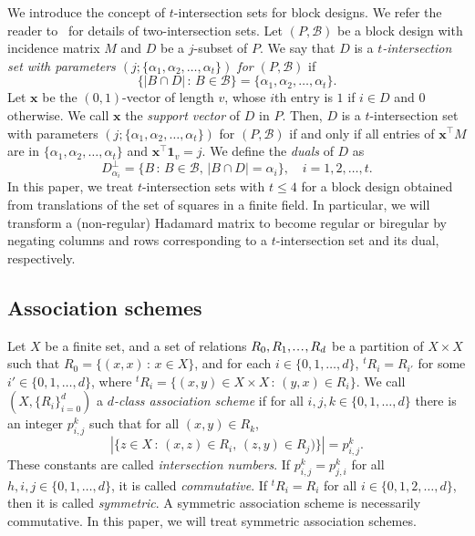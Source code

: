 \documentclass[ALCO,ThmDefs,Unicode]{cedram}
\newcommand*\tra{\top}
\newcommand*{\un}{\mathbf{1}}
\newcommand*{\bfx}{\mathbf{x}}
\newcommand*{\mk}{\mkern -1mu}
\newcommand*{\mK}{\mkern 1mu}
\newcommand{\sdots}{{\mk.\mK.\mK.\mK}}
\begin{document}
We introduce the concept of $t$-intersection sets for block designs. We refer the reader to~\cite{MS} for details of two-intersection sets. Let $(P,{\mathcal B})$ be a block design with incidence matrix $M$ and $D$ be a $j$-subset of $P$. We say that $D$ is a \emph{$t$-intersection set with parameters $(j;\{\alpha_1,\alpha_2,\ldots,\alpha_t\})$ for $(P,{\mathcal B})$} if
\[
\{|B\cap D|\,:\,B\in {\mathcal B}\}=\{\alpha_1,\alpha_2,\ldots,\alpha_t\}.
\]
Let $\bfx$ be the $(0,1)$-vector of length $v$, whose $i$th entry is $1$ if $i\in D$ and $0$ otherwise. We call $\bfx$ the \emph{support vector} of $D$ in $P$. Then, $D$ is a $t$-intersection set with parameters $(j;\{\alpha_1,\alpha_2,\ldots,\alpha_t\})$ for $(P,{\mathcal B})$ if and only if all entries of $\bfx^\tra M$ are in $\{\alpha_1,\alpha_2,\ldots,\alpha_t\}$ and $\bfx^\tra \un_{v}=j$. We define the \emph{duals} of $D$ as
\begin{equation}\label{eq:defdual}
D_{\alpha_i}^\perp=\{B\,:\,B\in {\mathcal B},\,|B\cap D|=\alpha_i\}, \quad i=1,2,\ldots,t.
\end{equation}
In this paper, we treat $t$-intersection sets with $t\le 4$ for a block design obtained from translations of the set of squares in a finite field. In particular, we will transform a (non-regular) Hadamard matrix to become regular or biregular by negating columns and rows corresponding to a $t$-intersection set and its dual, respectively.



\subsection{Association schemes}


Let $X$ be a finite set, and a set of relations $R_0, R_1,\sdots,R_d$ be a partition of $X\times X$ such that $R_0=\{(x,x)\,:\,x\in X\}$, and for each $i\in \{0,1,\ldots,d\}$, ${}^tR_i=R_{i'}$ for some $i'\in \{0,1,\ldots,d\}$, where ${}^t R_i=\{(x,y)\in X\times X\,:\,(y,x)\in R_i\}$. We call $(X,\{R_i\}_{i=0}^d)$ a \emph{$d$-class association scheme} if for all $i,j,k\in \{0,1,\ldots,d\}$ there is an integer $p_{i,j}^k$ such that for all $(x,y)\in R_k$,
\[
|\{z\in X\,:\,(x,z)\in R_i,\,(z,y)\in R_j)\}|=p_{i,j}^k.
\]
These constants are called \emph{intersection numbers}. If $p_{i,j}^k=p_{j,i}^k$ for all $h,i,j\in \{0,1,\ldots,d\}$, it is called \emph{commutative}. If ${}^tR_i=R_{i}$ for all $i\in \{0,1,2,\ldots,d\}$, then it is called \emph{symmetric}. A symmetric association scheme is necessarily commutative. In this paper, we will treat symmetric association schemes.
\end{document}
